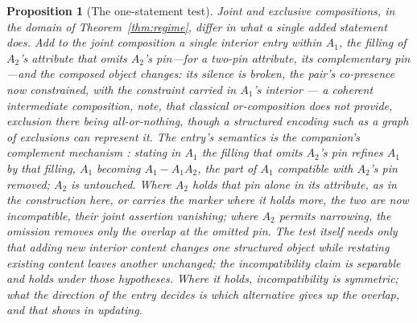 \documentclass[11pt]{article}
\newtheorem{proposition}{Proposition}
\begin{document}
\begin{proposition}[The one-statement test]\label{prop:onestatement}
Joint and exclusive compositions, in the domain of Theorem~\ref{thm:regime}, differ in what a single added statement does. Add to the joint composition a single interior entry within $A_1$, the filling of $A_2$'s attribute that omits $A_2$'s pin---for a two-pin attribute, its complementary pin---and the composed object changes: its silence is broken, the pair's co-presence now constrained, with the constraint carried in $A_1$'s interior --- a coherent intermediate composition, note, that classical or-composition does not provide, exclusion there being all-or-nothing, though a structured encoding such as a graph of exclusions can represent it. The entry's semantics is the companion's complement mechanism \parencite{AethusTree}: stating in $A_1$ the filling that omits $A_2$'s pin refines $A_1$ by that filling, $A_1$ becoming $A_1 - A_1 A_2$, the part of $A_1$ compatible with $A_2$'s pin removed; $A_2$ is untouched. Where $A_2$ holds that pin alone in its attribute, as in the construction here, or carries the marker where it holds more, the two are now incompatible, their joint assertion vanishing; where $A_2$ permits narrowing, the omission removes only the overlap at the omitted pin. The test itself needs only that adding new interior content changes one structured object while restating existing content leaves another unchanged; the incompatibility claim is separable and holds under those hypotheses. Where it holds, incompatibility is symmetric; what the direction of the entry decides is which alternative gives up the overlap, and that shows in updating.


\end{proposition}
\end{document}
